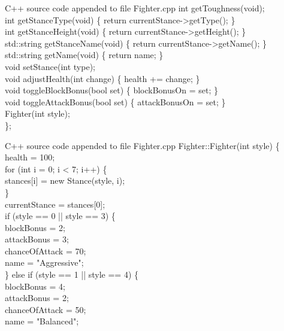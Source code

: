 \documentclass{article}
\begin{document}
\clearpage
\begin{GFT}{C++ source code appended to file Fighter.cpp}
\+        int getToughness(void);\\
\+        int getStanceType(void) \{ return currentStance->getType(); \}\\
\+        int getStanceHeight(void) \{ return currentStance->getHeight(); \}\\
\+        std::string getStanceName(void) \{ return currentStance->getName(); \}\\
\+        std::string getName(void) \{ return name; \}\\
\+        void setStance(int type);\\
\+        void adjustHealth(int change) \{ health += change; \}\\
\+        void toggleBlockBonus(bool set) \{ blockBonusOn = set; \}\\
\+        void toggleAttackBonus(bool set) \{ attackBonusOn = set; \}\\
\+        Fighter(int style);\\
\+\};\\
\end{GFT}
\clearpage
\begin{GFT}{C++ source code appended to file Fighter.cpp}
\+Fighter::Fighter(int style) \{\\
\+    health = 100;\\
\+    for (int i = 0; i < 7; i++) \{\\
\+        stances[i] = new Stance(style, i);\\
\+    \}\\
\+    currentStance = stances[0];\\
\+    if (style == 0 || style == 3) \{\\
\+        blockBonus = 2;\\
\+        attackBonus = 3;\\
\+        chanceOfAttack = 70;\\
\+        name = "Aggressive";\\
\+    \} else if (style == 1 || style == 4) \{\\
\+        blockBonus = 4;\\
\+        attackBonus = 2;\\
\+        chanceOfAttack = 50;\\
\+        name = "Balanced";\\
\end{GFT}
\clearpage
\end{document}
